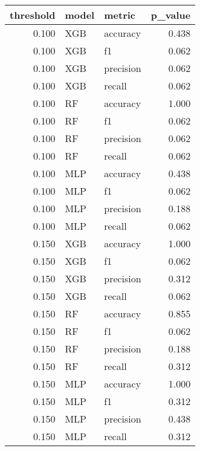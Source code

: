 \begin{tabular}{rllr}
\toprule
threshold & model & metric & p_value \\
\midrule
0.100 & XGB & accuracy & 0.438 \\
0.100 & XGB & f1 & 0.062 \\
0.100 & XGB & precision & 0.062 \\
0.100 & XGB & recall & 0.062 \\
0.100 & RF & accuracy & 1.000 \\
0.100 & RF & f1 & 0.062 \\
0.100 & RF & precision & 0.062 \\
0.100 & RF & recall & 0.062 \\
0.100 & MLP & accuracy & 0.438 \\
0.100 & MLP & f1 & 0.062 \\
0.100 & MLP & precision & 0.188 \\
0.100 & MLP & recall & 0.062 \\
0.150 & XGB & accuracy & 1.000 \\
0.150 & XGB & f1 & 0.062 \\
0.150 & XGB & precision & 0.312 \\
0.150 & XGB & recall & 0.062 \\
0.150 & RF & accuracy & 0.855 \\
0.150 & RF & f1 & 0.062 \\
0.150 & RF & precision & 0.188 \\
0.150 & RF & recall & 0.312 \\
0.150 & MLP & accuracy & 1.000 \\
0.150 & MLP & f1 & 0.312 \\
0.150 & MLP & precision & 0.438 \\
0.150 & MLP & recall & 0.312 \\
\bottomrule
\end{tabular}

